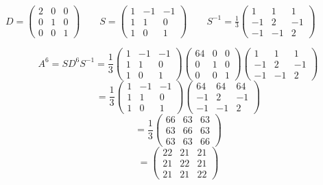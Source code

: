 \documentclass[12pt]{article}
\begin{document}
\begin{center}
    $D = \begin{pmatrix}
        2 & 0 & 0\\
        0 & 1 & 0\\
        0 & 0 & 1
    \end{pmatrix} \quad \quad S = \begin{pmatrix}
        1 & -1 & -1\\
        1 & 1 & 0\\
        1 & 0 & 1
    \end{pmatrix} \quad \quad S^{-1} = \frac{1}{3}\begin{pmatrix}
        1 & 1  &1\\
        -1 & 2 & -1\\
        -1 & -1 & 2
    \end{pmatrix}$
\end{center}
\[A^6 = SD^6S^{-1} = \frac{1}{3}\begin{pmatrix}
    1 & -1 & -1\\
        1 & 1 & 0\\
        1 & 0 & 1
\end{pmatrix}\begin{pmatrix}
    64 & 0 & 0\\
    0 & 1 & 0\\
    0 & 0 & 1
\end{pmatrix}\begin{pmatrix}
    1 & 1 & 1\\
    -1 & 2 & -1\\
    -1 & -1 & 2
\end{pmatrix}\]
\[= \frac{1}{3}\begin{pmatrix}
    1 & -1 & -1\\
    1 & 1 & 0\\
    1 & 0 & 1
\end{pmatrix} \begin{pmatrix}
    64 & 64 & 64\\
    -1 & 2 & -1\\
    -1 & -1 & 2
\end{pmatrix}\]
\[= \frac{1}{3}\begin{pmatrix}
    66 & 63 & 63\\
    63 & 66 & 63\\
    63 & 63 & 66
\end{pmatrix}\]
\[= \begin{pmatrix}
    22 & 21 & 21\\
    21 & 22 & 21\\
    21 & 21 & 22
\end{pmatrix}\]
\end{document}
